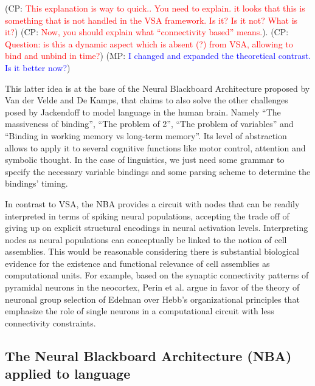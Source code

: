 \documentclass[10pt]{article}
\newcommand{\noteCP}[1]{(CP: \textcolor{red}{#1})}
\newcommand{\noteMP}[2]{(MP: \textcolor{blue}{#1})}
\begin{document}
\noteCP{This explanation is way to quick.. You need to explain. it looks that this is something that is not handled in the VSA framework. Is it? Is it not? What is it?}
\noteCP{Now, you should explain what ``connectivity based'' means.}.
\noteCP{Question: is this a dynamic aspect which is absent (?) from VSA, allowing to bind and unbind in time?}
\noteMP{I changed and expanded the theoretical contrast. Is it better now?}.

This latter idea is at the base of the Neural Blackboard Architecture proposed by Van der Velde and De Kamps\cite{van_der_Velde_2006}, that claims to also solve the other challenges posed by Jackendoff to model language in the human brain.
Namely ``The massiveness of binding'', ``The problem of 2'', ``The problem of variables'' and ``Binding in working memory vs long-term memory''.
Its level of abstraction allows to apply it to several cognitive functions like motor control, attention and symbolic thought.
In the case of linguistics, we just need some grammar to specify the necessary variable bindings and some parsing scheme to determine the bindings' timing.

In contrast to VSA, the NBA provides a circuit with nodes that can be readily interpreted in terms of spiking neural populations, accepting the trade off of giving up on explicit structural encodings in neural activation levels.
Interpreting nodes as neural populations can conceptually be linked to the notion of cell assemblies.
This would be reasonable considering there is substantial biological evidence for the existence and functional relevance of cell assemblies as computational units\cite{Huyck_2013}.
For example, based on the synaptic connectivity patterns of pyramidal neurons in the neocortex, Perin et al.\cite{Perin_2011} argue in favor of the theory of neuronal group selection of Edelman\cite{edelman1987neural} over Hebb's organizational principles\cite{hebb2005organization} that emphasize the role of single neurons in a computational circuit with less connectivity constraints.


\subsection{The Neural Blackboard Architecture (NBA) applied to language}

{\label{935508}}
\end{document}
